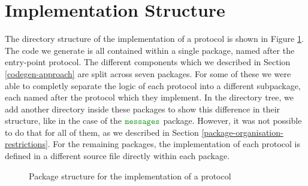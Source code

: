 \documentclass[12pt,twoside]{report}
\begin{document}

\section{Implementation Structure}\label{project-structure}

The directory structure of the implementation of a protocol is shown in Figure \ref{project-package-structure}. The code we generate is all contained within a single package, named after the entry-point protocol. The different components which we described in Section \ref{codegen-approach} are split across seven packages. For some of these we were able to completly separate the logic of each protocol into a different subpackage, each named after the protocol which they implement. In the directory tree, we add another directory inside these packages to show this difference in their structure, like in the case of the $\pkgname{messages}$ package. However, it was not possible to do that for all of them, as we described in Section \ref{package-organisation-restrictions}. For the remaining packages, the implementation of each protocol is defined in a different source file directly within each package.\\

\begin{figure}[h!]
    \centering
    \begin{minipage}{5cm}
    \end{minipage}
    \caption{Package structure for the implementation of a protocol}
    \label{project-package-structure}
\end{figure}
\end{document}
